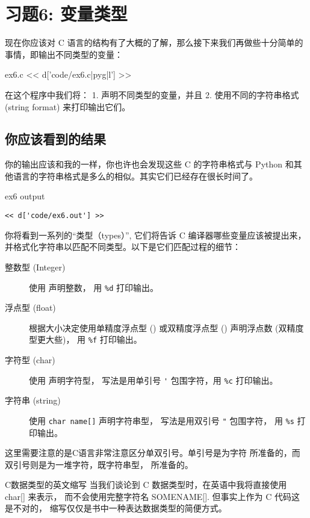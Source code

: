 \chapter{习题6: 变量类型}

现在你应该对 C 语言的结构有了大概的了解，那么接下来我们再做些十分简单的事情，即输出不同类型的变量：

\begin{code}{ex6.c}
<< d['code/ex6.c|pyg|l'] >>
\end{code}

在这个程序中我们将：
1. 声明不同类型的变量，并且
2. 使用不同的字符串格式(string format)  来打印输出它们。


\section{你应该看到的结果}

你的输出应该和我的一样，你也许也会发现这些 C 的字符串格式与 Python 和其他语言的字符串格式是多么的相似。其实它们已经存在很长时间了。

\begin{code}{ex6 output}
\begin{lstlisting}
<< d['code/ex6.out'] >>
\end{lstlisting}
\end{code}

你将看到一系列的“类型（types）”, 它们将告诉 C 编译器哪些变量应该被提出来，并格式化字符串以匹配不同类型。以下是它们匹配过程的细节：

\begin{description}
\item[整数型 (Integer) ] 使用  声明整数， 用 \verb|%d| 打印输出。
\item[浮点型 (float)] 根据大小决定使用单精度浮点型 () 或双精度浮点型 () 声明浮点数 (双精度型更大些)， 用 \verb|%f| 打印输出。
\item[字符型 (char)] 使用  声明字符型， 写法是用单引号 \verb|'| 包围字符，用 \verb|%c| 打印输出。
\item[字符串 (string)] 使用 \verb|char name[]| 声明字符串型， 写法是用双引号 \verb|"| 包围字符， 用 \verb|%s| 打印输出。 
\end{description}

这里需要注意的是C语言非常注意区分单双引号。单引号是为字符  所准备的，而双引号则是为一堆字符，既字符串型，  所准备的。

\begin{aside}{C数据类型的英文缩写}
当我们谈论到 C 数据类型时，在英语中我将直接使用 char[] 来表示， 而不会使用完整字符名 SOMENAME[]. 但事实上作为 C 代码这是不对的， 缩写仅仅是书中一种表达数据类型的简便方式。
\end{aside}

